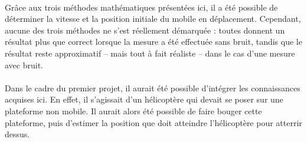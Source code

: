 \documentclass[a4paper,11pt]{article}
\begin{document}
		\paragraph{}
		Grâce aux trois méthodes mathématiques présentées ici, il a été possible de déterminer la vitesse et la position initiale du mobile en déplacement. Cependant, aucune des trois méthodes ne s’est réellement démarquée : toutes donnent un résultat plus que correct lorsque la mesure a été effectuée sans bruit, tandis que le résultat reste approximatif – mais tout à fait réaliste – dans le cas d’une mesure avec bruit.

		\paragraph{}
		Dans le cadre du premier projet, il aurait été possible d’intégrer les connaissances acquises ici. En effet, il s’agissait d’un hélicoptère qui devait se poser sur une plateforme non mobile. Il aurait alors été possible de faire bouger cette plateforme, puis d’estimer la position que doit atteindre l’hélicoptère pour atterrir dessus.
\end{document}
